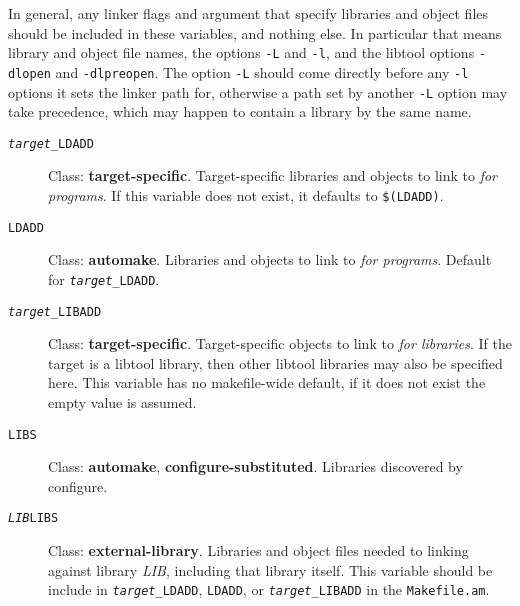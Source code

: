 \documentclass[11pt,a4paper,headinclude,footinclude,DIV16,normalheadings]{scrartcl}
\begin{document}
\begin{description}
  In general, any linker flags and argument that specify libraries and object
  files should be included in these variables, and nothing else.  In
  particular that means library and object file names, the options \texttt{-L}
  and \texttt{-l}, and the libtool options \texttt{-dlopen} and
  \texttt{-dlpreopen}.  The option \texttt{-L} should come directly before any
  \texttt{-l} options it sets the linker path for, otherwise a path set by
  another \texttt{-L} option may take precedence, which may happen to contain
  a library by the same name.
  \begin{description}
  \item[\texttt{\textit{target}\_LDADD}] Class: {\bf target-specific}.
    Target-specific libraries and objects to link to {\em for programs}.  If
    this variable does not exist, it defaults to \texttt{\$(LDADD)}.
  \item[\texttt{LDADD}] Class: {\bf automake}.  Libraries and objects
    to link to {\em for programs}.  Default for
    \texttt{\textit{target}\_LDADD}.
  \item[\texttt{\textit{target}\_LIBADD}] Class: {\bf target-specific}.
    Target-specific objects to link to {\em for libraries}.  If the target is
    a libtool library, then other libtool libraries may also be specified
    here.  This variable has no makefile-wide default, if it does not exist
    the empty value is assumed.
  \item[\texttt{LIBS}] Class: {\bf automake}, {\bf configure-substituted}.
    Libraries discovered by configure.
  \item[\texttt{\textit{LIB}LIBS}] Class: {\bf external-library}.  Libraries
    and object files needed to linking against library \textit{LIB}, including
    that library itself.  This variable should be include in
    \texttt{\textit{target}\_LDADD}, \texttt{LDADD}, or
    \texttt{\textit{target}\_LIBADD} in the \texttt{Makefile.am}.
  \end{description}
\end{description}

\end{document}
